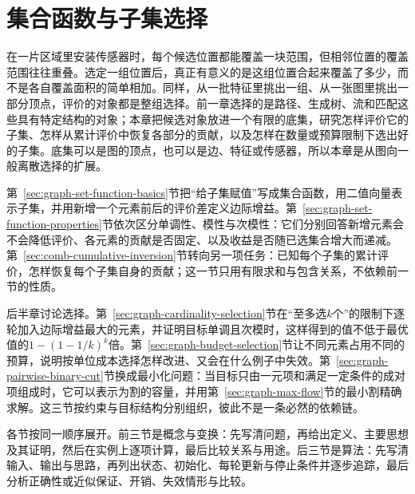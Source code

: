 \chapter{集合函数与子集选择}
\label{chap:graph-set-functions}

在一片区域里安装传感器时，每个候选位置都能覆盖一块范围，但相邻位置的覆盖范围往往重叠。选定一组位置后，真正有意义的是这组位置合起来覆盖了多少，而不是各自覆盖面积的简单相加。同样，从一批特征里挑出一组、从一张图里挑出一部分顶点，评价的对象都是整组选择。前一章选择的是路径、生成树、流和匹配这些具有特定结构的对象；本章把候选对象放进一个有限的底集，研究怎样评价它的子集、怎样从累计评价中恢复各部分的贡献，以及怎样在数量或预算限制下选出好的子集。底集可以是图的顶点，也可以是边、特征或传感器，所以本章是从图向一般离散选择的扩展。

第~\ref{sec:graph-set-function-basics}节把“给子集赋值”写成集合函数，用二值向量表示子集，并用新增一个元素前后的评价差定义边际增益。第~\ref{sec:graph-set-function-properties}节依次区分单调性、模性与次模性：它们分别回答新增元素会不会降低评价、各元素的贡献是否固定、以及收益是否随已选集合增大而递减。第~\ref{sec:comb-cumulative-inversion}节转向另一项任务：已知每个子集的累计评价，怎样恢复每个子集自身的贡献；这一节只用有限求和与包含关系，不依赖前一节的性质。

后半章讨论选择。第~\ref{sec:graph-cardinality-selection}节在“至多选$k$个”的限制下逐轮加入边际增益最大的元素，并证明目标单调且次模时，这样得到的值不低于最优值的$1-(1-1/k)^k$倍。第~\ref{sec:graph-budget-selection}节让不同元素占用不同的预算，说明按单位成本选择怎样改进、又会在什么例子中失效。第~\ref{sec:graph-pairwise-binary-cut}节换成最小化问题：当目标只由一元项和满足一定条件的成对项组成时，它可以表示为割的容量，并用第~\ref{sec:graph-max-flow}节的最小割精确求解。这三节按约束与目标结构分别组织，彼此不是一条必然的依赖链。

各节按同一顺序展开。前三节是概念与变换：先写清问题，再给出定义、主要思想及其证明，然后在实例上逐项计算，最后比较关系与用途。后三节是算法：先写清输入、输出与思路，再列出状态、初始化、每轮更新与停止条件并逐步追踪，最后分析正确性或近似保证、开销、失效情形与比较。








